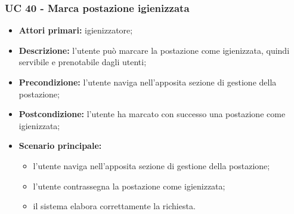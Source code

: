 \subsubsection{UC 40 - Marca postazione igienizzata}

\begin{itemize}
\item \textbf{Attori primari:} igienizzatore;
\item \textbf{Descrizione:} l'utente può marcare la postazione come igienizzata, quindi servibile e prenotabile dagli utenti;
\item \textbf{Precondizione:} l'utente naviga nell’apposita sezione di gestione della postazione; 
\item \textbf{Postcondizione:} l’utente ha marcato con successo una postazione come igienizzata;
\item \textbf{Scenario principale:} 
	\begin{itemize}
		\item l'utente naviga nell’apposita sezione di gestione della postazione;		
		\item l’utente contrassegna la postazione come igienizzata;
		\item il sistema elabora correttamente la richiesta.
	\end{itemize}
\end{itemize}



